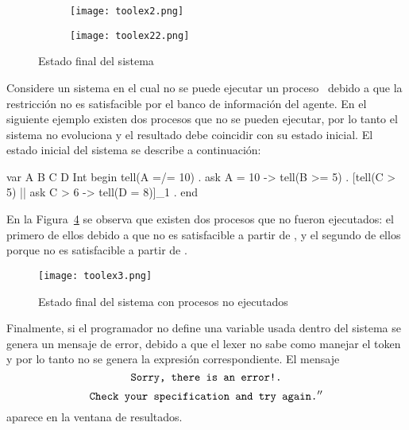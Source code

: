 \begin{figure}[htbp] %
   \centering
   \begin{subfigure}[b]{5in}
      \texttt{[image: toolex2.png]}
      \caption{}
      \label{fig:Ng1} 
   \end{subfigure}
   \begin{subfigure}[b]{5in}
      \texttt{[image: toolex22.png]}
      \caption{}
      \label{fig:Ng2}
   \end{subfigure}
   \caption{Estado final del sistema}
   \label{fig:toolout1}
\end{figure}

Considere un sistema en el cual no se puede ejecutar un proceso \ask \ debido a que la restricci\'on no es satisfacible por el banco de informaci\'on del agente. En el siguiente ejemplo existen dos procesos que no se pueden ejecutar, por lo tanto el sistema no evoluciona y el resultado debe coincidir con su estado inicial. El estado inicial del sistema se describe a continuaci\'on:

\begin{sccp}
var A B C D Int
begin
tell(A =/= 10) .
ask A = 10 -> tell(B >= 5) .
[tell(C > 5) || ask C > 6 -> tell(D = 8)]_1 .
end
\end{sccp}

En la Figura~\ref{fig:toolout3} se observa que existen dos procesos que no fueron ejecutados: el primero de ellos debido a que  no es satisfacible a partir de , y el segundo de ellos porque  no es satisfacible a partir de .

\begin{figure}[htbp] %
   \centering
   \texttt{[image: toolex3.png]} 
   \caption{Estado final del sistema con procesos no ejecutados}
   \label{fig:toolout3}
\end{figure}

Finalmente, si el programador no define una variable usada dentro del sistema se genera un mensaje de error, debido a que el lexer no sabe como manejar el token y por lo tanto no se genera la expresi\'on correspondiente. El mensaje \[\textnormal{\texttt{Sorry, there is an error!.}}\] \[\textnormal{\texttt{Check your specification and try again.}}''\] aparece en la ventana de resultados.



